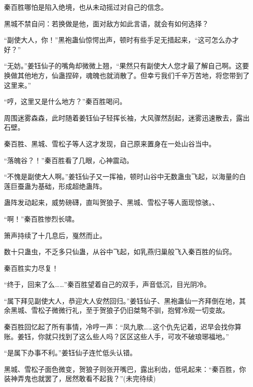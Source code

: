\begin{this_body}
秦百胜哪怕是陷入绝境，也从未动摇过对自己的信念。

黑城不禁自问：若换做是他，面对敌方如此言语，就会有如何选择？

“副使大人，你！”黑袍蛊仙惊愕出声，顿时有些手足无措起来，“这可怎么办才好？”

“无妨。”姜钰仙子的嘴角却微微上翘，“果然只有副使大人您才最了解自己啊。这要换做其他地方，仙蛊捏碎，魂魄也就消散了。但幸亏我们千辛万苦地，将您带到了这里来。”

“哼，这里又是什么地方？”秦百胜喝问。

周围迷雾森森，此时随着姜钰仙子轻挥长袖，大风骤然刮起，迷雾迅速散去，露出石壁。

秦百胜、黑城、雪松子等人这才发现，自己原来置身在一处山谷当中。

“落魄谷？！”秦百胜看了几眼，心神震动。

“不愧是副使大人啊。”姜钰仙子又一挥袖，顿时山谷中无数蛊虫飞起，以海量的白莲巨蚕蛊为基础，形成超绝蛊阵。

蛊阵发动起来，威势磅礴，直叫贺狼子、黑城、雪松子等人面现惊骇。、

“啊！”秦百胜惨烈长啸。

箫声持续了十几息后，戛然而止。

数十只蛊虫，不乏多只仙蛊，从谷中飞起，如乳燕归巢般飞入秦百胜的仙窍。

秦百胜实力尽复！

“终于，回来了么……”秦百胜望着自己的双手，声音低沉，目光阴冷。

“属下拜见副使大人，恭迎大人安然回归。”姜钰仙子、黑袍蛊仙一齐拜倒在地，其余黑城、雪松子微微行礼，至于贺狼子仍旧桀骜不驯，抱臂冷观一切变故。

秦百胜回忆起了所有事情，冷哼一声：“凤九歌……这个仇先记着，迟早会找你算账。姜钰，你就只找到了这么些人吗？区区这些人手，可攻不破琅琊福地。”

“是属下办事不利。”姜钰仙子连忙低头认错。

黑城、雪松子面色微变，贺狼子则张开嘴巴，露出利齿，低吼起来：“秦百胜，你装神弄鬼也就罢了，居然敢看不起我？”(未完待续)

\end{this_body}

